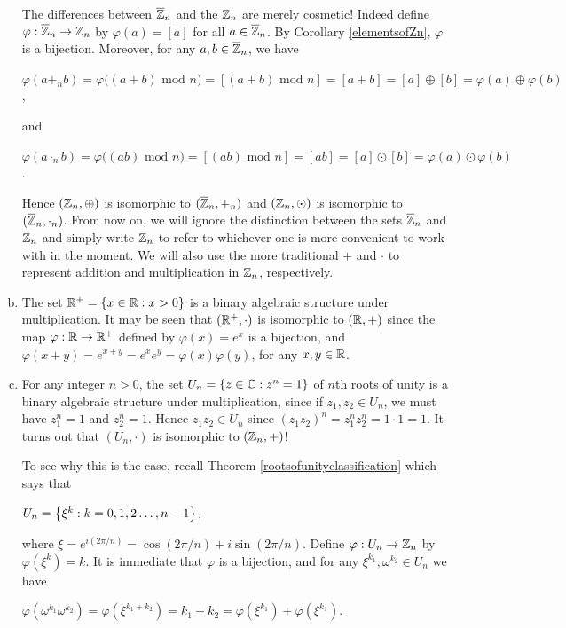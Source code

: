 \documentclass[11pt,fleqn,dvipsnames,usenames]{article}
\newcommand{\p}{\noindent}
\begin{document}
\begin{examples}
\begin{enumerate}[(a)]
\p The differences between $\overline{\mathbb{Z}}_{n}$ and the $\mathbb{Z}_{n}$ are merely cosmetic!  Indeed define $\varphi:\overline{\mathbb{Z}}_{n}\to \mathbb{Z}_{n}$ by $\varphi(a) = [a]$ for all $a \in \overline{\mathbb{Z}}_{n}$.  By Corollary \ref{elementsofZn}, $\varphi$ is a bijection.  Moreover, for any $a,b\in\overline{\mathbb{Z}}_{n}$, we have 
\begin{center}
$\varphi(a+_nb) = \varphi\big((a+b)\text{ mod }n\big) = [(a+b)\text{ mod }n] = [a+b] = [a]\oplus [b] = \varphi(a)\oplus\varphi(b)$,
\end{center}
and
\begin{center}
$\varphi(a\cdot_nb) = \varphi\big((ab)\text{ mod }n\big) = [(ab)\text{ mod }n] = [ab] = [a]\odot [b] = \varphi(a)\odot\varphi(b)$.
\end{center}
%
\p Hence $(\mathbb{Z}_{n},\oplus)$ is isomorphic to $(\overline{\mathbb{Z}}_n,+_n)$ and $(\mathbb{Z}_{n},\odot)$ is isomorphic to $(\overline{\mathbb{Z}}_n,\cdot_n)$.  From now on, we will ignore the distinction between the sets $\overline{\mathbb{Z}}_n$ and $\mathbb{Z}_{n}$ and simply write $\mathbb{Z}_{n}$ to refer to whichever one is more convenient to work with in the moment.  We will also use the more traditional $+$ and $\cdot$ to represent addition and multiplication in $\mathbb{Z}_{n}$, respectively.
%
\item The set $\mathbb{R}^{+} = \left\{x\in\mathbb{R}:x>0\right\}$ is a binary algebraic structure under multiplication.  It may be seen that $(\mathbb{R}^{+},\cdot)$ is isomorphic to $(\mathbb{R}, +)$ since the map $\varphi:\mathbb{R}\to\mathbb{R}^{+}$ defined by $\varphi(x) = e^{x}$ is a bijection, and $\varphi(x+y) = e^{x + y} = e^xe^{y} = \varphi(x)\varphi(y)$, for any $x,y\in\mathbb{R}$.
%
\item For any integer $n>0$, the set $U_{n} = \left\{z\in\mathbb{C}:z^n = 1\right\}$ of $n$th roots of unity is a binary algebraic structure under multiplication, since if $z_{1},z_{2}\in U_{n}$, we must have $z_{1}^n = 1$ and $z_{2}^n = 1$.  Hence $z_{1}z_{2}\in U_n$ since $(z_{1}z_{2})^n = z_{1}^nz_{2}^n = 1\cdot 1 = 1$.  It turns out that $(U_{n},\cdot)$ is isomorphic to $(\mathbb{Z}_{n},+)$!
\vsp

\p To see why this is the case, recall Theorem \ref{rootsofunityclassification} which says that
\begin{center}
$U_{n} = \left\{\xi^{k}:k=0,1,2\ldots, n-1\right\}$,
\end{center}
where $\xi = e^{i(2\pi/n)} = \cos(2\pi/n) + i\sin(2\pi/n)$.  Define $\varphi:U_{n}\to\mathbb{Z}_{n}$ by $\varphi(\xi^k) = k$.  It is immediate that $\varphi$ is a bijection, and for any $\xi^{k_1},\omega^{k_2}\in U_n$ we have
\begin{center}
$\varphi(\omega^{k_1}\omega^{k_2}) = \varphi(\xi^{k_1+k_2}) = k_1+k_2 = \varphi(\xi^{k_1}) + \varphi(\xi^{k_1})$.
\end{center}
\end{enumerate}
\end{examples}
\end{document}

